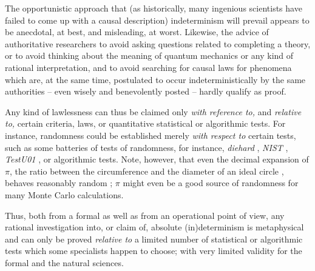 \documentclass[%
 reprint,
 showpacs,
 showkeys,
 preprintnumbers,
 amsmath,amssymb,
 aps,
 prl,
  longbibliography,
 ]{revtex4-1}
\begin{document}
The opportunistic approach that (as historically,  many ingenious scientists have failed to come up with a causal description)
indeterminism will prevail appears to be anecdotal, at best, and  misleading, at worst.
Likewise, the advice of authoritative researchers to
avoid asking questions related
to completing a theory,
or to avoid thinking about the meaning of quantum mechanics or any  kind of rational interpretation,
and to avoid searching for causal laws for phenomena which are, at the same time,
postulated to occur indeterministically by the same authorities --  even wisely and benevolently posted  --
hardly qualify as proof.

Any kind of lawlessness can thus be claimed only
{\em with reference to,} and {\em relative to,} certain criteria, laws, or quantitative statistical or algorithmic tests.
For instance, randomness could be established merely {\em with respect to} certain tests,
such as some batteries of tests of randomness, for instance, {\em diehard} \citep{diehard}, {\it NIST} \citep{Rukhin-nist},  {\it TestU01} \citep{1268777},
or algorithmic \citep{calude-dinneen05,PhysRevA.82.022102} tests.
Note, however, that even the decimal expansion of $\pi$, the ratio between the circumference and the diameter of an ideal circle \citep{bailey97,bailey05},
behaves reasonably random \citep{PhysRevA.82.022102};
$\pi$ might even be a good source of randomness for many Monte Carlo calculations.


Thus, both from a  formal as well as from an operational point of view,
any rational investigation into, or claim of, absolute (in)determinism is metaphysical and can only be proved
{\em relative to} a limited number of statistical or algorithmic tests
which some specialists happen to choose;
with very limited validity for the formal and the natural sciences.







\end{document}
